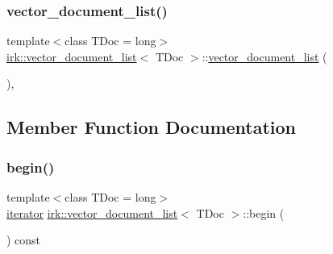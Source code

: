 \mbox{\label{classirk_1_1vector__document__list_a5560538fbf6e6087623cdff8f1bb4452}} 
\subsubsection{\texorpdfstring{vector\+\_\+document\+\_\+list()}{vector\_document\_list()}\hspace{0.1cm}{\footnotesize\ttfamily [4/4]}}
{\footnotesize\ttfamily template$<$class T\+Doc  = long$>$ \\
\mbox{\hyperlink{classirk_1_1vector__document__list}{irk\+::vector\+\_\+document\+\_\+list}}$<$ T\+Doc $>$\+::\mbox{\hyperlink{classirk_1_1vector__document__list}{vector\+\_\+document\+\_\+list}} (\begin{DoxyParamCaption}\item[{\mbox{\hyperlink{classirk_1_1vector__document__list}{vector\+\_\+document\+\_\+list}}$<$ T\+Doc $>$ \&\&}]{ }\end{DoxyParamCaption})\hspace{0.3cm}{\ttfamily [default]}, {\ttfamily [noexcept]}}



\subsection{Member Function Documentation}
\mbox{\label{classirk_1_1vector__document__list_a014b3737e63a4472e66ccb90a515f340}} 
\subsubsection{\texorpdfstring{begin()}{begin()}}
{\footnotesize\ttfamily template$<$class T\+Doc  = long$>$ \\
\mbox{\hyperlink{classirk_1_1vector__document__list_a42499af78a7d66a1b626858cd424600f}{iterator}} \mbox{\hyperlink{classirk_1_1vector__document__list}{irk\+::vector\+\_\+document\+\_\+list}}$<$ T\+Doc $>$\+::begin (\begin{DoxyParamCaption}{ }\end{DoxyParamCaption}) const\hspace{0.3cm}{\ttfamily [inline]}}

